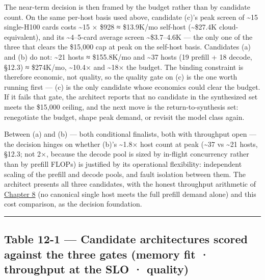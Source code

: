 The near-term decision is then framed by the budget rather than by
candidate count. On the same per-host basis used above, candidate (c)'s
peak screen of \textasciitilde15 single-H100 cards costs
\textasciitilde15 × \$928 ≈ \$13.9K/mo self-host (\textasciitilde\$27.4K
cloud-equivalent), and its \textasciitilde4--5-card average screen
\textasciitilde\$3.7--4.6K --- the only one of the three that clears the
\$15,000 cap at peak on the self-host basis. Candidates (a) and (b) do
not: \textasciitilde21 hosts ≈ \$155.8K/mo and \textasciitilde37 hosts
(19 prefill + 18 decode, §12.3) ≈ \$274K/mo, \textasciitilde10.4× and
\textasciitilde18× the budget. The binding constraint is therefore
economic, not quality, so the quality gate on (c) is the one worth
running first --- (c) is the only candidate whose economics could clear
the budget. If it fails that gate, the architect reports that no
candidate in the synthesized set meets the \$15,000 ceiling, and the
next move is the return-to-synthesis set: renegotiate the budget, shape
peak demand, or revisit the model class again.

Between (a) and (b) --- both conditional finalists, both with throughput
open --- the decision hinges on whether (b)'s \textasciitilde1.8× host
count at peak (\textasciitilde37 vs \textasciitilde21 hosts, §12.3; not
2×, because the decode pool is sized by in-flight concurrency rather
than by prefill FLOPs) is justified by its operational flexibility:
independent scaling of the prefill and decode pools, and fault isolation
between them. The architect presents all three candidates, with the
honest throughput arithmetic of \hyperref[chap:8]{Chapter 8} (no canonical single host
meets the full prefill demand alone) and this cost comparison, as the
decision foundation.

\begin{center}\rule{0.5\linewidth}{0.5pt}\end{center}

\subsection{Table 12-1 --- Candidate architectures scored against the
three gates (memory fit · throughput at the SLO ·
quality)}\label{table-12-1-candidate-architectures-scored-against-the-three-gates-memory-fit-throughput-at-the-slo-quality}

